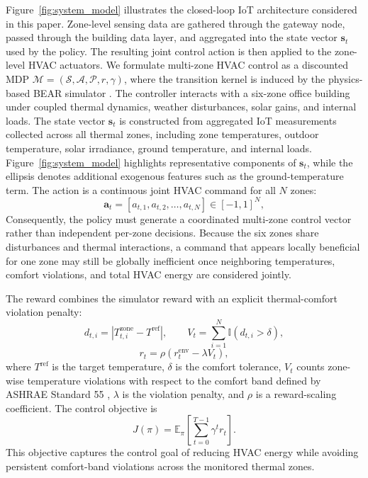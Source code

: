 \documentclass[conference]{IEEEtran}
\theoremstyle{nonumberplain}
\theoremstyle{plain}
\begin{document}
Figure~\ref{fig:system_model} illustrates the closed-loop IoT architecture considered in this paper. Zone-level sensing data are gathered through the gateway node, passed through the building data layer, and aggregated into the state vector $\mathbf{s}_t$ used by the policy. The resulting joint control action is then applied to the zone-level HVAC actuators.
We formulate multi-zone HVAC control as a discounted MDP $\mathcal{M}=(\mathcal{S},\mathcal{A},\mathcal{P},r,\gamma)$, where the transition kernel is induced by the physics-based BEAR simulator \cite{zhang2023bear}. The controller interacts with a six-zone office building under coupled thermal dynamics, weather disturbances, solar gains, and internal loads.
The state vector $\mathbf{s}_t$ is constructed from aggregated IoT measurements collected across all thermal zones, including zone temperatures, outdoor temperature, solar irradiance, ground temperature, and internal loads. Figure~\ref{fig:system_model} highlights representative components of $\mathbf{s}_t$, while the ellipsis denotes additional exogenous features such as the ground-temperature term. The action is a continuous joint HVAC command for all $N$ zones:
\begin{equation}
    \mathbf{a}_t =
    [a_{t,1}, a_{t,2}, \dots, a_{t,N}]
    \in [-1,1]^N,
    \label{eq:action}
\end{equation}
Consequently, the policy must generate a coordinated multi-zone control vector rather than independent per-zone decisions. Because the six zones share disturbances and thermal interactions, a command that appears locally beneficial for one zone may still be globally inefficient once neighboring temperatures, comfort violations, and total HVAC energy are considered jointly.

The reward combines the simulator reward with an explicit thermal-comfort violation penalty:
\begin{equation}
    d_{t,i}=\left|T_{t,i}^{\mathrm{zone}}-T^{\mathrm{ref}}\right|,
    \qquad
    V_t=\sum_{i=1}^{N}\mathbb{I}(d_{t,i}>\delta),
    \label{eq:violation}
\end{equation}
\begin{equation}
    r_t = \rho \left( r_t^{\mathrm{env}} - \lambda V_t \right),
    \label{eq:reward}
\end{equation}
where $T^{\mathrm{ref}}$ is the target temperature, $\delta$ is the comfort tolerance, $V_t$ counts zone-wise temperature violations with respect to the comfort band defined by ASHRAE Standard 55 \cite{standard2023thermal}, $\lambda$ is the violation penalty, and $\rho$ is a reward-scaling coefficient. The control objective is
\begin{equation}
    J(\pi)=\mathbb{E}_{\pi}\left[\sum_{t=0}^{T-1}\gamma^t r_t\right].
    \label{eq:objective}
\end{equation}
This objective captures the control goal of reducing HVAC energy while avoiding persistent comfort-band violations across the monitored thermal zones.
\end{document}
